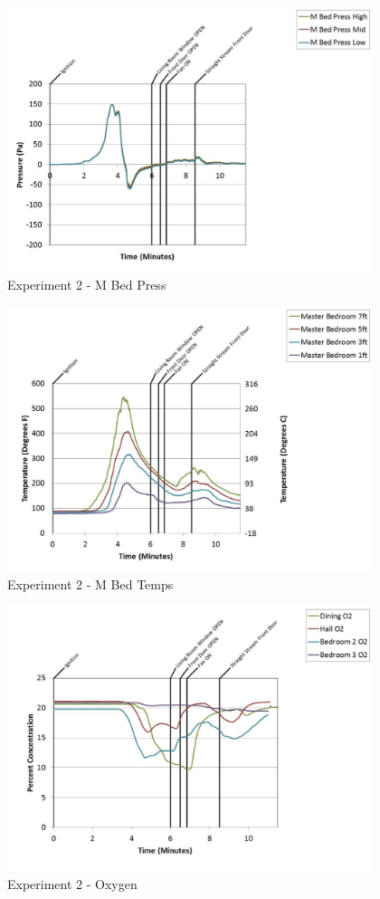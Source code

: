 \documentclass{article}
\begin{document}
\begin{appendices}
	\clearpage

	\begin{figure}[h!]
		\centering
		\includegraphics[height=3.05in]{0_Images/Results_Charts/Exp_2_Charts/MBedPress.pdf}
		\caption{Experiment 2 - M Bed Press}
	\end{figure}
 

	\begin{figure}[h!]
		\centering
		\includegraphics[height=3.05in]{0_Images/Results_Charts/Exp_2_Charts/MBedTemps.pdf}
		\caption{Experiment 2 - M Bed Temps}
	\end{figure}
 
	\clearpage

	\begin{figure}[h!]
		\centering
		\includegraphics[height=3.05in]{0_Images/Results_Charts/Exp_2_Charts/Oxygen.pdf}
		\caption{Experiment 2 - Oxygen}
	\end{figure}
 


\end{appendices}
\end{document}
